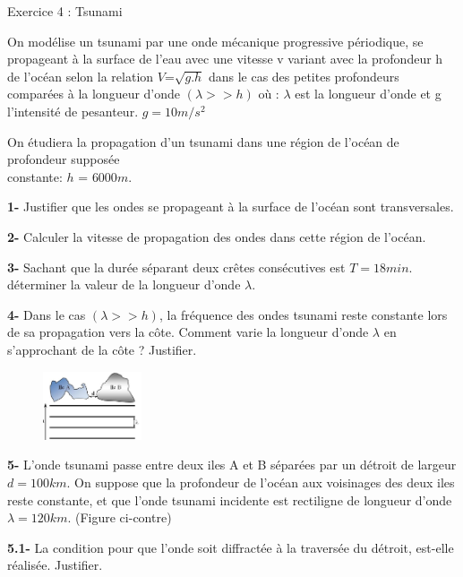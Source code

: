 \documentclass[12pt, french]{article}
\begin{document}
\begin{tcolorbox}
	Exercice 4 : Tsunami
\end{tcolorbox}

On modélise un tsunami par une onde mécanique progressive périodique, se propageant à la
surface de l’eau avec une vitesse v variant avec la profondeur h de l’océan selon la relation $V$=$\sqrt{g.h}$
dans le cas des petites profondeurs comparées à la longueur d’onde $(\lambda >> h)$ où : $\lambda$ est la longueur
d’onde et g l’intensité de pesanteur. $g = 10m/s^2$

On étudiera la propagation d’un tsunami dans une région de l’océan de profondeur supposée\\constante: $h$ = $6000 m$.

\textbf{1- }Justifier que les ondes se propageant à la surface de l’océan sont transversales.

\textbf{2- }Calculer la vitesse de propagation des ondes dans cette région de l’océan.

\textbf{3- }Sachant que la durée séparant deux crêtes consécutives est $T = 18 min$. déterminer la valeur de
la longueur d’onde $\lambda$.

\textbf{4- }Dans le cas $(\lambda >> h)$, la fréquence des ondes tsunami reste constante lors de sa propagation vers la côte. Comment varie la longueur d’onde $\lambda$ en s’approchant de la côte ? Justifier.

\begin{figure}
  \begin{center}
	  \vspace{-0.7cm}
	\includegraphics[width=0.26\textwidth]{./img/ex4.png}
  \end{center}
\end{figure}


\textbf{5- }L’onde tsunami passe entre deux iles A et B séparées par un détroit de largeur $d = 100 km$. On
suppose que la profondeur de l’océan aux voisinages des deux iles reste constante, et que l’onde tsunami incidente est rectiligne de
longueur d’onde $\lambda = 120 km$. (Figure ci-contre)

\textbf{5.1- }La condition pour que l’onde soit diffractée à la traversée du détroit, est-elle réalisée. Justifier.
\end{document}
